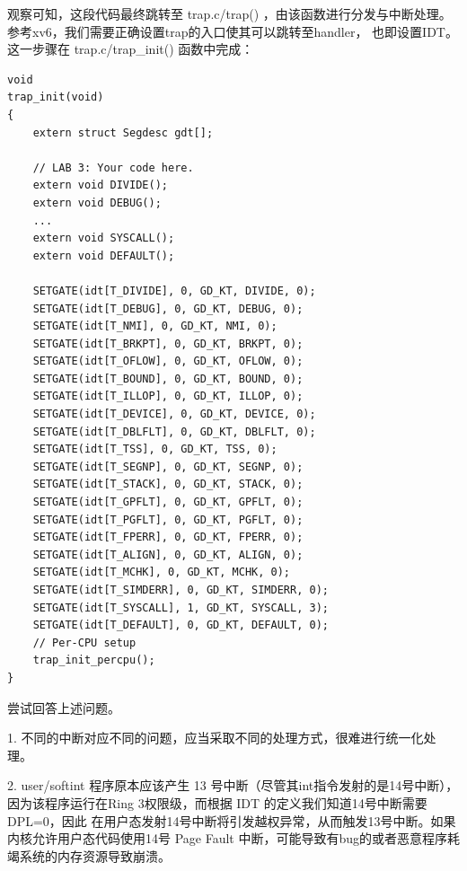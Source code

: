 \documentclass[12pt, letterpaper]{report}
\begin{document}
\newpage
观察可知，这段代码最终跳转至 trap.c/trap() ，由该函数进行分发与中断处理。
参考xv6，我们需要正确设置trap的入口使其可以跳转至handler，
也即设置IDT。这一步骤在 trap.c/trap\_init() 函数中完成：
\lstset{style=CStyle}
\setmainfont{Consolas}
\begin{lstlisting}
void
trap_init(void)
{
    extern struct Segdesc gdt[];

    // LAB 3: Your code here.
    extern void DIVIDE();
    extern void DEBUG();
    ...
    extern void SYSCALL();
    extern void DEFAULT();

    SETGATE(idt[T_DIVIDE], 0, GD_KT, DIVIDE, 0);
    SETGATE(idt[T_DEBUG], 0, GD_KT, DEBUG, 0);
    SETGATE(idt[T_NMI], 0, GD_KT, NMI, 0);
    SETGATE(idt[T_BRKPT], 0, GD_KT, BRKPT, 0);
    SETGATE(idt[T_OFLOW], 0, GD_KT, OFLOW, 0);
    SETGATE(idt[T_BOUND], 0, GD_KT, BOUND, 0);
    SETGATE(idt[T_ILLOP], 0, GD_KT, ILLOP, 0);
    SETGATE(idt[T_DEVICE], 0, GD_KT, DEVICE, 0);
    SETGATE(idt[T_DBLFLT], 0, GD_KT, DBLFLT, 0);
    SETGATE(idt[T_TSS], 0, GD_KT, TSS, 0);
    SETGATE(idt[T_SEGNP], 0, GD_KT, SEGNP, 0);
    SETGATE(idt[T_STACK], 0, GD_KT, STACK, 0);
    SETGATE(idt[T_GPFLT], 0, GD_KT, GPFLT, 0);
    SETGATE(idt[T_PGFLT], 0, GD_KT, PGFLT, 0);
    SETGATE(idt[T_FPERR], 0, GD_KT, FPERR, 0);
    SETGATE(idt[T_ALIGN], 0, GD_KT, ALIGN, 0);
    SETGATE(idt[T_MCHK], 0, GD_KT, MCHK, 0);
    SETGATE(idt[T_SIMDERR], 0, GD_KT, SIMDERR, 0);
    SETGATE(idt[T_SYSCALL], 1, GD_KT, SYSCALL, 3);
    SETGATE(idt[T_DEFAULT], 0, GD_KT, DEFAULT, 0);
    // Per-CPU setup 
    trap_init_percpu();
}
\end{lstlisting}
\setmainfont{Times New Roman}

\newpage 
{}
\quad \par 
尝试回答上述问题。\par 
1. 不同的中断对应不同的问题，应当采取不同的处理方式，很难进行统一化处理。\par 
2. user/softint 程序原本应该产生 13 号中断（尽管其int指令发射的是14号中断），
因为该程序运行在Ring 3权限级，而根据 IDT 的定义我们知道14号中断需要DPL=0，因此
在用户态发射14号中断将引发越权异常，从而触发13号中断。如果内核允许用户态代码使用14号
Page Fault 中断，可能导致有bug的或者恶意程序耗竭系统的内存资源导致崩溃。\par 
\end{document}

